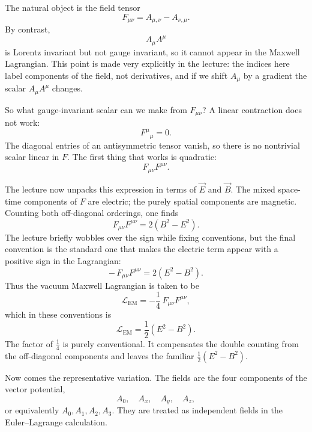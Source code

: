 The natural object is the field tensor
\begin{equation}
F_{\mu\nu}=A_{\mu,\nu}-A_{\nu,\mu}.
\end{equation}
By contrast,
\begin{equation}
A_\mu A^\mu
\end{equation}
is Lorentz invariant but not gauge invariant, so it cannot appear in the Maxwell Lagrangian. This point is made very explicitly in the lecture: the indices here label components of the field, not derivatives, and if we shift \(A_\mu\) by a gradient the scalar \(A_\mu A^\mu\) changes.

So what gauge-invariant scalar can we make from \(F_{\mu\nu}\)? A linear contraction does not work:
\begin{equation}
F^\mu{}_\mu=0.
\end{equation}
The diagonal entries of an antisymmetric tensor vanish, so there is no nontrivial scalar linear in \(F\). The first thing that works is quadratic:
\begin{equation}
F_{\mu\nu}F^{\mu\nu}.
\end{equation}

The lecture now unpacks this expression in terms of \(\vec E\) and \(\vec B\). The mixed space-time components of \(F\) are electric; the purely spatial components are magnetic. Counting both off-diagonal orderings, one finds
\begin{equation}
F_{\mu\nu}F^{\mu\nu}=2(B^2-E^2).
\end{equation}
The lecture briefly wobbles over the sign while fixing conventions, but the final convention is the standard one that makes the electric term appear with a positive sign in the Lagrangian:
\begin{equation}
-\,F_{\mu\nu}F^{\mu\nu}=2(E^2-B^2).
\end{equation}
Thus the vacuum Maxwell Lagrangian is taken to be
\begin{equation}
\mathcal L_{\mathrm{EM}}
=
-\frac14\,F_{\mu\nu}F^{\mu\nu},
\end{equation}
which in these conventions is
\begin{equation}
\mathcal L_{\mathrm{EM}}
=
\frac12(E^2-B^2).
\end{equation}
The factor of \(\frac14\) is purely conventional. It compensates the double counting from the off-diagonal components and leaves the familiar \(\frac12(E^2-B^2)\).

Now comes the representative variation. The fields are the four components of the vector potential,
\begin{equation}
A_0,\quad A_x,\quad A_y,\quad A_z,
\end{equation}
or equivalently \(A_0,A_1,A_2,A_3\). They are treated as independent fields in the Euler--Lagrange calculation.

